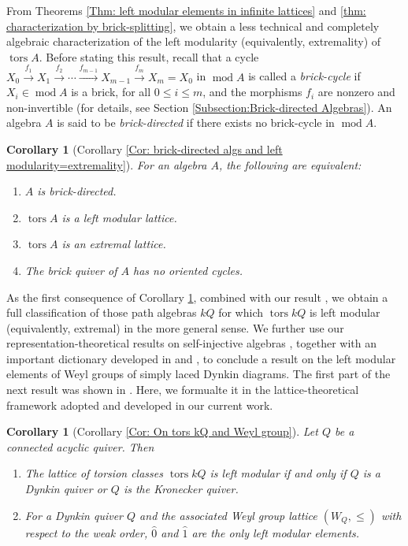 \documentclass{amsart}
\theoremstyle{thmstyle}
\newtheorem{corollary}[thm]{Corollary}
\theoremstyle{exstyle}
\theoremstyle{defstyle}
\theoremstyle{remstyle}
\theoremstyle{remstyle}
\DeclareMathOperator*{\modu}{mod}
\DeclareMathOperator*{\tors}{tors}
\begin{document}
From Theorems \ref{Thm: left modular elements in infinite lattices} and \ref{thm: characterization by brick-splitting}, we obtain a less technical and completely algebraic characterization of the left modularity (equivalently, extremality) of $\tors A$. Before stating this result, recall that a cycle $X_0\xrightarrow{f_1} X_1\xrightarrow{f_2}  \cdots \xrightarrow{f_{m-1}}  X_{m-1}\xrightarrow{f_m}  X_m=X_0$ in $\modu A$ is called a \emph{brick-cycle} if $X_i \in \modu A$ is a brick, for all $0\leq i\leq m$, and the morphisms $f_i$ are nonzero and non-invertible (for details, see Section \ref{Subsection:Brick-directed Algebras}). An algebra $A$ is said to be \emph{brick-directed} if there exists no brick-cycle in $\modu A$. 

\begin{corollary}[Corollary \ref{Cor: brick-directed algs and left modularity=extremality}]
\label{Cor: left modularity and brick-directed algs}
For an algebra $A$, the following are equivalent:
\begin{enumerate}
    \item $A$ is brick-directed.
    \item $\tors A$ is a left modular lattice.
    \item $\tors A$ is an extremal lattice.
    \item The brick quiver of $A$ has no oriented cycles.
\end{enumerate}
\end{corollary}

As the first consequence of Corollary \ref{Cor: left modularity and brick-directed algs}, combined with our result \cite[Prop. 4.9]{AI+}, we obtain a full classification of those path algebras $kQ$ for which $\tors kQ$ is left modular (equivalently, extremal) in the more general sense. We further use our representation-theoretical results on self-injective algebras \cite[Cor. 3.16]{AI+}, together with an important dictionary developed in \cite{IT} and \cite{Mi}, to conclude a result on the left modular elements of Weyl groups of simply laced Dynkin diagrams. 
The first part of the next result was shown in \cite[Prop. 4.9]{AI+}. Here, we formualte it in the lattice-theoretical framework adopted and developed in our current work.

\begin{corollary}[{Corollary \ref{Cor: On tors kQ and Weyl group}}]\label{Cor: On tors kQ and Weyl group in Introduction}
Let $Q$ be a connected acyclic quiver. Then
\begin{enumerate}
    \item The lattice of torsion classes $\tors kQ$ is left modular if and only if $Q$ is a Dynkin quiver or $Q$ is the Kronecker quiver.
    \item For a Dynkin quiver $Q$ and the associated Weyl group lattice  $(W_Q,\leq)$ with respect to the weak order, $\hat{0}$ and $\hat{1}$ are the only left modular elements.
\end{enumerate}

\end{corollary}
\end{document}
